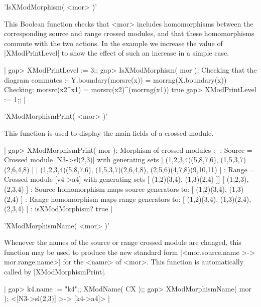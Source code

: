 %

'IsXModMorphism( <mor> )'

This Boolean function checks that <mor> includes homomorphisms
between the corresponding source and range crossed modules,
and that these homomorphisms commute with the two actions.
In the example we increase the value of |XModPrintLevel| to show
the effect of such an increase in a simple case.

|    gap> XModPrintLevel := 3;;
    gap> IsXModMorphism( mor );
    Checking that the diagram commutes :- 
             Y.boundary(morsrc(x)) = morrng(X.boundary(x)) 
    Checking:  morsrc(x2^x1) = morsrc(x2)^(morrng(x1))
    true
    gap> XModPrintLevel := 1;;   |

%

'XModMorphismPrint( <mor> )'

This function is used to display the main fields of a crossed module.

|    gap> XModMorphismPrint( mor );
    Morphism of crossed modules :-
    : Source = Crossed module [N3->sl(2,3)] with generating sets
      [ (1,2,3,4)(5,8,7,6), (1,5,3,7)(2,6,4,8) ]
      [ (1,2,3,4)(5,8,7,6), (1,5,3,7)(2,6,4,8), (2,5,6)(4,7,8)(9,10,11) ]
    :  Range = Crossed module [v4->a4] with generating sets
      [ (1,2)(3,4), (1,3)(2,4) ]]
      [ (1,2,3), (2,3,4) ]
    : Source homomorphism maps source generators to:
      [ (1,2)(3,4), (1,3)(2,4) ]
    : Range homomorphism maps range generators to:
      [ (1,2)(3,4), (1,3)(2,4), (2,3,4) ]
    : isXModMorphism? true  |

%

'XModMorphismName( <mor> )'

Whenever the names of the source or range crossed module are changed,
this function may be used to produce the new standard form
|<mor.source.name >-> mor.range.name>| for the <name> of <mor>.
This function is automatically called by |XModMorphismPrint|.

|    gap> k4.name := "k4";;  XModName( CX );;
    gap> XModMorphismName( mor );
    <[N3->sl(2,3)] >-> [k4->a4]>  |
    
%

